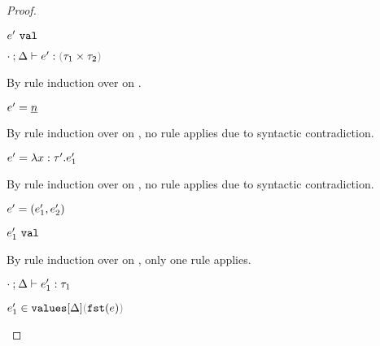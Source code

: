 \begin{proof}
\begin{byCases}
\begin{byCases}
\begin{byCases}
\begin{byCases}
\begin{byCases}
\begin{pfsteps*}
            \item $e' ~\mathtt{val}$  
            \item $\hexptyp{\cdot}{\Delta}{e'}{\tprod{\tau_1}{\tau_2}}$  
            \end{pfsteps*}
            By rule induction over  on .
            \begin{byCases}
              \item[\text{(\ref{rule:VNum})}]
              \begin{pfsteps*}
              \item $e'=\underline{n}$ 
              \end{pfsteps*} 
              By rule induction over  on , no rule applies due to syntactic contradiction.
              \item[\text{(\ref{rule:VLam})}]
              \begin{pfsteps*} 
              \item $e'=\lambda x:\tau'.e_1'$ 
              \end{pfsteps*}
              By rule induction over  on , no rule applies due to syntactic contradiction.
              \item[\text{(\ref{rule:VPair})}] 
              \begin{pfsteps*} 
              \item $e'=(e_1' , e_2')$ 
              \item $e_1' ~\mathtt{val}$  
              \end{pfsteps*}
              By rule induction over  on , only one rule applies.
              \begin{byCases}
                \item[\text{(\ref{rule:TPair})}]
                \begin{pfsteps*}
                \item $\cdot \mathbin{;} \Delta \vdash e_1' : \tau_1$  
                \item $\inValues{e_1'}{\Delta}{\hfst{e}}$  

\end{pfsteps*}
\end{byCases}
\end{byCases}
\end{byCases}
\end{byCases}
\end{byCases}
\end{byCases}
\end{byCases}
\end{proof}
